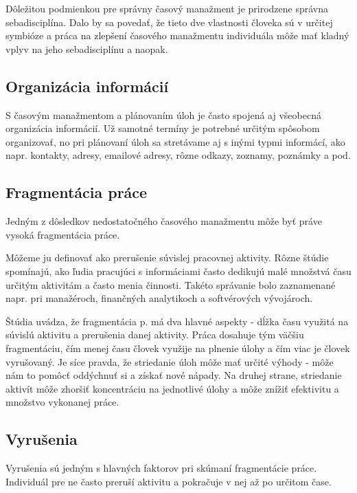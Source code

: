 \documentclass[10pt,slovak,a4paper]{article}
\begin{document}
		Dôležitou podmienkou pre správny časový manažment je prirodzene správna sebadisciplína. Dalo by sa povedať, že tieto dve vlastnosti človeka sú v určitej symbióze a práca na zlepšení časového manažmentu individuála môže mať kladný vplyv na jeho sebadisciplínu a naopak.
		
	\subsection{Organizácia informácií}
	
		S časovým manažmentom a plánovaním úloh je často spojená aj všeobecná organizácia informácií. Už samotné termíny je potrebné určitým spôsobom organizovať, no pri plánovaní úloh sa stretávame aj s inými typmi informácí, ako napr. kontakty, adresy, emailové adresy, rôzne odkazy, zoznamy, poznámky a pod.
	
	\subsection{Fragmentácia práce}
		Jedným z dôsledkov nedostatočného časového manažmentu môže byť práve vysoká fragmentácia práce.
		
		Môžeme ju definovať ako prerušenie súvislej pracovnej aktivity. Rôzne štúdie spomínajú, ako ľudia pracujúci s informáciami často dedikujú malé množstvá času určitým aktivitám a často menia činnosti. Takéto správanie bolo zaznamenané napr. pri manažéroch, finančných analytikoch a softvérových vývojároch\cite{NoTask}.
		
		Štúdia\cite{NoTask} uvádza, že fragmentácia p. má dva hlavné aspekty - dĺžka času využitá na súvislú aktivitu a prerušenia danej aktivity. Práca dosahuje tým väčšiu fragmentáciu, čím menej času človek využije na plnenie úlohy a čím viac je človek vyrušovaný. Je síce pravda, že striedanie úloh môže mať určité výhody - môže nám to pomôcť oddýchnuť si a získať nové nápady. Na druhej strane, striedanie aktivít môže zhoršiť koncentráciu na jednotlivé úlohy a môže znížiť efektivitu a množstvo vykonanej práce\cite{NoTask}.
		
	\subsection{Vyrušenia}
		Vyrušenia sú jedným s hlavných faktorov pri skúmaní fragmentácie práce. Individuál pre ne často preruší aktivitu a pokračuje v nej až po určitom čase.
		
\end{document}
